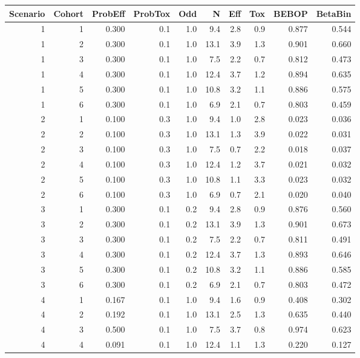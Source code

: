 \documentclass{article}
\begin{document}
\begin{table}[h!]
	\centering
	\begin{tabular}{rrrrrrrrrr}
		\hline
		Scenario & Cohort & ProbEff & ProbTox & Odd & N & Eff & Tox & BEBOP & BetaBin \\ 
		\hline
		1 & 1 & 0.300 & 0.1 & 1.0 & 9.4 & 2.8 & 0.9 & 0.877 & 0.544 \\ 
		1 & 2 & 0.300 & 0.1 & 1.0 & 13.1 & 3.9 & 1.3 & 0.901 & 0.660 \\ 
		1 & 3 & 0.300 & 0.1 & 1.0 & 7.5 & 2.2 & 0.7 & 0.812 & 0.473 \\ 
		1 & 4 & 0.300 & 0.1 & 1.0 & 12.4 & 3.7 & 1.2 & 0.894 & 0.635 \\ 
		1 & 5 & 0.300 & 0.1 & 1.0 & 10.8 & 3.2 & 1.1 & 0.886 & 0.575 \\ 
		1 & 6 & 0.300 & 0.1 & 1.0 & 6.9 & 2.1 & 0.7 & 0.803 & 0.459 \\ 
		\hline
		2 & 1 & 0.100 & 0.3 & 1.0 & 9.4 & 1.0 & 2.8 & 0.023 & 0.036 \\ 
		2 & 2 & 0.100 & 0.3 & 1.0 & 13.1 & 1.3 & 3.9 & 0.022 & 0.031 \\ 
		2 & 3 & 0.100 & 0.3 & 1.0 & 7.5 & 0.7 & 2.2 & 0.018 & 0.037 \\ 
		2 & 4 & 0.100 & 0.3 & 1.0 & 12.4 & 1.2 & 3.7 & 0.021 & 0.032 \\ 
		2 & 5 & 0.100 & 0.3 & 1.0 & 10.8 & 1.1 & 3.3 & 0.023 & 0.032 \\ 
		2 & 6 & 0.100 & 0.3 & 1.0 & 6.9 & 0.7 & 2.1 & 0.020 & 0.040 \\ 
		\hline
		3 & 1 & 0.300 & 0.1 & 0.2 & 9.4 & 2.8 & 0.9 & 0.876 & 0.560 \\ 
		3 & 2 & 0.300 & 0.1 & 0.2 & 13.1 & 3.9 & 1.3 & 0.901 & 0.673 \\ 
		3 & 3 & 0.300 & 0.1 & 0.2 & 7.5 & 2.2 & 0.7 & 0.811 & 0.491 \\ 
		3 & 4 & 0.300 & 0.1 & 0.2 & 12.4 & 3.7 & 1.3 & 0.893 & 0.646 \\ 
		3 & 5 & 0.300 & 0.1 & 0.2 & 10.8 & 3.2 & 1.1 & 0.886 & 0.585 \\ 
		3 & 6 & 0.300 & 0.1 & 0.2 & 6.9 & 2.1 & 0.7 & 0.803 & 0.472 \\ 
		\hline
		4 & 1 & 0.167 & 0.1 & 1.0 & 9.4 & 1.6 & 0.9 & 0.408 & 0.302 \\ 
		4 & 2 & 0.192 & 0.1 & 1.0 & 13.1 & 2.5 & 1.3 & 0.635 & 0.440 \\ 
		4 & 3 & 0.500 & 0.1 & 1.0 & 7.5 & 3.7 & 0.8 & 0.974 & 0.623 \\ 
		4 & 4 & 0.091 & 0.1 & 1.0 & 12.4 & 1.1 & 1.3 & 0.220 & 0.127 \\ 

\end{tabular}
\end{table}
\end{document}

